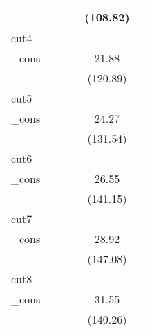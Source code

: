 {\begin{tabular}{l*{5}{c}}
            &                     &                     &                     &    (108.82)         &                     \\
\hline
cut4        &                     &                     &                     &                     &                     \\
\_cons      &                     &                     &                     &       21.88\sym{***}&                     \\
            &                     &                     &                     &    (120.89)         &                     \\
\hline
cut5        &                     &                     &                     &                     &                     \\
\_cons      &                     &                     &                     &       24.27\sym{***}&                     \\
            &                     &                     &                     &    (131.54)         &                     \\
\hline
cut6        &                     &                     &                     &                     &                     \\
\_cons      &                     &                     &                     &       26.55\sym{***}&                     \\
            &                     &                     &                     &    (141.15)         &                     \\
\hline
cut7        &                     &                     &                     &                     &                     \\
\_cons      &                     &                     &                     &       28.92\sym{***}&                     \\
            &                     &                     &                     &    (147.08)         &                     \\
\hline
cut8        &                     &                     &                     &                     &                     \\
\_cons      &                     &                     &                     &       31.55\sym{***}&                     \\
            &                     &                     &                     &    (140.26)         &                     \\

\end{tabular}}
